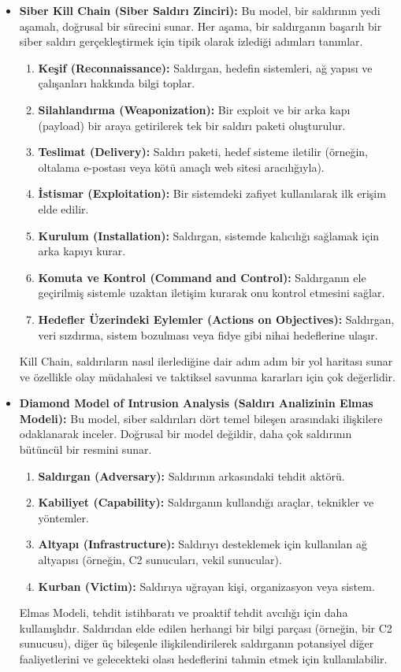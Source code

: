 \begin{itemize}
    \item \textbf{Siber Kill Chain (Siber Saldırı Zinciri):} Bu model, bir saldırının yedi aşamalı, doğrusal bir sürecini sunar. Her aşama, bir saldırganın başarılı bir siber saldırı gerçekleştirmek için tipik olarak izlediği adımları tanımlar.
    \begin{enumerate}
        \item \textbf{Keşif (Reconnaissance):} Saldırgan, hedefin sistemleri, ağ yapısı ve çalışanları hakkında bilgi toplar.
        \item \textbf{Silahlandırma (Weaponization):} Bir exploit ve bir arka kapı (payload) bir araya getirilerek tek bir saldırı paketi oluşturulur.
        \item \textbf{Teslimat (Delivery):} Saldırı paketi, hedef sisteme iletilir (örneğin, oltalama e-postası veya kötü amaçlı web sitesi aracılığıyla).
        \item \textbf{İstismar (Exploitation):} Bir sistemdeki zafiyet kullanılarak ilk erişim elde edilir.
        \item \textbf{Kurulum (Installation):} Saldırgan, sistemde kalıcılığı sağlamak için arka kapıyı kurar.
        \item \textbf{Komuta ve Kontrol (Command and Control):} Saldırganın ele geçirilmiş sistemle uzaktan iletişim kurarak onu kontrol etmesini sağlar.
        \item \textbf{Hedefler Üzerindeki Eylemler (Actions on Objectives):} Saldırgan, veri sızdırma, sistem bozulması veya fidye gibi nihai hedeflerine ulaşır.
    \end{enumerate}
    Kill Chain, saldırıların nasıl ilerlediğine dair adım adım bir yol haritası sunar ve özellikle olay müdahalesi ve taktiksel savunma kararları için çok değerlidir.
    \item \textbf{Diamond Model of Intrusion Analysis (Saldırı Analizinin Elmas Modeli):} Bu model, siber saldırıları dört temel bileşen arasındaki ilişkilere odaklanarak inceler. Doğrusal bir model değildir, daha çok saldırının bütüncül bir resmini sunar.
    \begin{enumerate}
        \item \textbf{Saldırgan (Adversary):} Saldırının arkasındaki tehdit aktörü.
        \item \textbf{Kabiliyet (Capability):} Saldırganın kullandığı araçlar, teknikler ve yöntemler.
        \item \textbf{Altyapı (Infrastructure):} Saldırıyı desteklemek için kullanılan ağ altyapısı (örneğin, C2 sunucuları, vekil sunucular).
        \item \textbf{Kurban (Victim):} Saldırıya uğrayan kişi, organizasyon veya sistem.
    \end{enumerate}
    Elmas Modeli, tehdit istihbaratı ve proaktif tehdit avcılığı için daha kullanışlıdır. Saldırıdan elde edilen herhangi bir bilgi parçası (örneğin, bir C2 sunucusu), diğer üç bileşenle ilişkilendirilerek saldırganın potansiyel diğer faaliyetlerini ve gelecekteki olası hedeflerini tahmin etmek için kullanılabilir.
\end{itemize}

